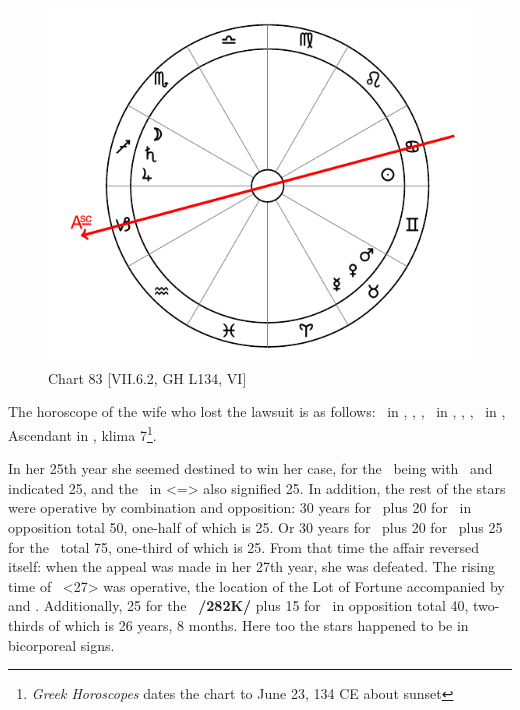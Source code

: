 \newpage
\begin{figure}
\centering
\vspace{0pt}
\includegraphics[width=.68\textwidth]{charts/7_6_02}
\caption{Chart 83 [VII.6.2, GH L134, VI]}
\label{fig:chart83}
\end{figure} 

The horoscope of the wife who lost the lawsuit is as follows: \Sun\, in \Cancer, \Moon, \Saturn, \Jupiter\, in
\Sagittarius, \Mars, \Venus, \Mercury\, in \Gemini, Ascendant in \Capricorn, klima 7\footnote{\textit{Greek Horoscopes} dates the chart to June 23, 134 CE about sunset}.

In her 25th year she seemed destined to win her case, for the \Moon\, being with \Jupiter\, and \Saturn\, indicated 25, and the \Sun\, in \Cancer <=\Moon> also signified 25. In addition, the rest of the stars were operative by combination and opposition: 30 years for \Saturn\, plus 20 for \Mercury\, in opposition total 50, one-half of which is 25. Or 30
years for \Saturn\, plus 20 for \Mercury\, plus 25 for the \Moon\, total 75, one-third of which is 25. From that time the affair reversed itself: when the appeal was made in her 27th year, she was defeated. The rising time of \Gemini\, <27> was operative, the location of the Lot of Fortune accompanied by \Mars\, and \Mercury. Additionally, 25 for the \Moon\, \textbf{/282K/} plus 15 for \Mars\, in opposition total 40, two-thirds of which is 26 years, 8 months. Here too the stars happened to be in bicorporeal signs.

